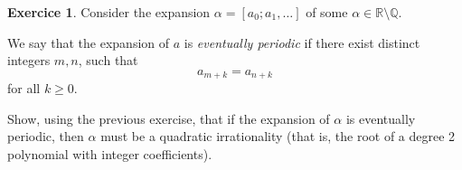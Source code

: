 \documentclass[12pt,a4paper]{article}
\theoremstyle{plain}
\newtheorem*{Sol*}{Solution}
\theoremstyle{definition}
\newtheorem{Ex}{Exercice}
\def \Q {\mathbb Q}
\def \R {\mathbb R}
\newif\ifsolutions
\newcommand{\exercise}[2]{
			\begin{Ex} #1 \end{Ex}
			\ifsolutions  \begin{Sol*} #2 \end{Sol*} \bigskip \else \bigskip  \fi
		}
\begin{document}
\exercise{
	Consider the expansion $\alpha = [a_0; a_1, \dots]$ of some $\alpha \in \R\setminus\Q$.

	We say that the expansion of $a$ is \emph{eventually periodic} if there exist distinct integers $m, n$, such that
		\[ a_{m+k} = a_{n+k} \]
	for all $k\geq0$.

	Show, using the previous exercise, that if the expansion of $\alpha$ is eventually periodic, then $\alpha$ must be a quadratic irrationality (that is, the root of a degree 2 polynomial with integer coefficients).
}
{
	In the notations of exercise 3, we have by assumption that $x_m = x_n$ for some distinct integers $m,n$.

	Exercise 3 implies that
		\[ \alpha = \frac{x_{m}p_{m-1} + p_{m-2}}{x_{m}q_{m-1} + q_{m-2}} =  \frac{x_{m}p_{n-1} + p_{n-2}}{x_{m}q_{n-1} + q_{n-2}}. \]
	 Manipulating the expression yields a degree two polynomial to which $x_m$ is solution.

	The number $\alpha$ belongs to the field $\Q(x_m)$ which has degree at most 2 over $\Q$. In fact it cannot have degree 1, since $\alpha$ was assumed irrational.
	As such, $\alpha$ is a quadratic irrationality.

}


%	
%
\end{document}
